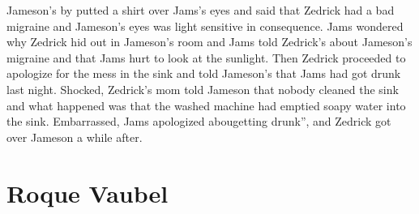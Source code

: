 \documentclass[12pt]{book}
\begin{document}
Jameson's by putted a shirt over Jams's eyes and said that Zedrick had a bad migraine and Jameson's eyes was light sensitive in consequence. Jams wondered why Zedrick hid out in Jameson's room and Jams told Zedrick's about Jameson's migraine and that Jams hurt to look at the sunlight. Then Zedrick proceeded to apologize for the mess in the sink and told Jameson's that Jams had got drunk last night. Shocked, Zedrick's mom told Jameson that nobody cleaned the sink and what happened was that the washed machine had emptied soapy water into the sink. Embarrassed, Jams apologized abougetting drunk'', and Zedrick got over Jameson a while after.



\chapter{Roque Vaubel}
\end{document}
